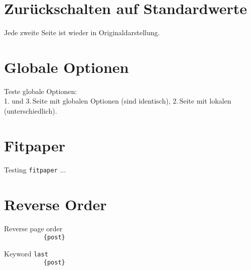\documentclass[a4paper]{article}
\begin{document}
\Huge




\begingroup
\section{Zur\"uckschalten auf Standardwerte}
Jede zweite Seite ist wieder in Originaldarstellung.











\endgroup

\begingroup
\section{Globale Optionen}
Teste globale Optionen:\\
1. und 3.\,Seite mit globalen Optionen (sind identisch),
2.\,Seite mit lokalen (unterschiedlich).




\endgroup


\section{Fitpaper}
\begingroup
Testing \texttt{fitpaper} ...

\endgroup


\section{Reverse Order}
\begingroup
Reverse page order\\
\verb||
\verb|           {post}|

Keyword \verb|last|\\
\verb||
\verb|           {post}|

\endgroup
\end{document}

